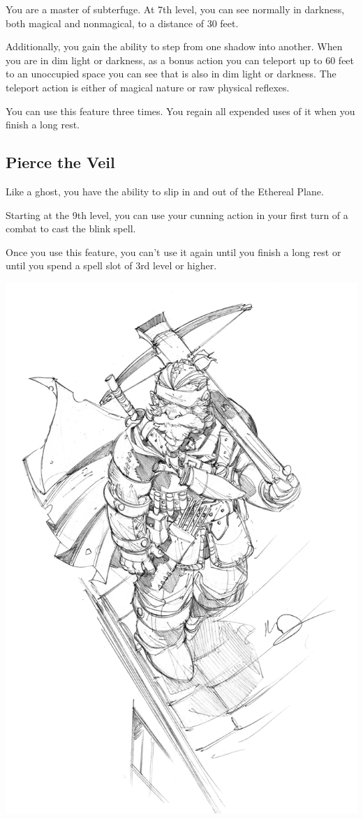 \begin{multicols*}{2}
You are a master of subterfuge. At 7th level, you can see normally in darkness, both magical and nonmagical, to a distance of 30 feet.

Additionally, you gain the ability to step from one shadow into another. When you are in dim light or darkness, as a bonus action you can teleport up to 60 feet to an unoccupied space you can see that is also in dim light or darkness. The teleport action is either of magical nature or raw physical reflexes. 

You can use this feature three times. You regain all expended uses of it when you finish a long rest.

\subsection*{Pierce the Veil}

Like a ghost, you have the ability to slip in and out of the Ethereal Plane.

Starting at the 9th level, you can use your cunning action in your first turn of a combat to cast the blink spell.

Once you use this feature, you can’t use it again until you finish a long rest or until you spend a spell slot of 3rd level or higher.

\begin{Figure}
\centering
\includegraphics[width=\textwidth]{img/hunter.png}
\end{Figure}
    

\end{multicols*}
